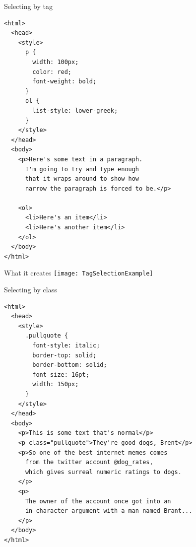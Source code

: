 \documentclass[notes]{beamer}
\begin{document}
\begin{frame}[fragile]{Selecting by tag}
  \begin{verbatim}
<html>
  <head>
    <style>
      p {
        width: 100px;
        color: red;
        font-weight: bold;
      }
      ol {
        list-style: lower-greek;
      }
    </style>
  </head>
  <body>
    <p>Here's some text in a paragraph.
      I'm going to try and type enough
      that it wraps around to show how
      narrow the paragraph is forced to be.</p>

    <ol>
      <li>Here's an item</li>
      <li>Here's another item</li>
    </ol>
  </body>
</html>
  \end{verbatim}
\end{frame}

\begin{frame}{What it creates}
  \texttt{[image: TagSelectionExample]}
\end{frame}

\begin{frame}[fragile]{Selecting by class}
  \begin{verbatim}
<html>
  <head>
    <style>
      .pullquote {
        font-style: italic;
        border-top: solid;
        border-bottom: solid;
        font-size: 16pt;
        width: 150px;
      }
    </style>
  </head>
  <body>
    <p>This is some text that's normal</p>
    <p class="pullquote">They're good dogs, Brent</p>
    <p>So one of the best internet memes comes
      from the twitter account @dog_rates,
      which gives surreal numeric ratings to dogs.
    </p>
    <p>
      The owner of the account once got into an
      in-character argument with a man named Brant...
    </p>
  </body>
</html>    
\end{verbatim}

\end{frame}
\end{document}
